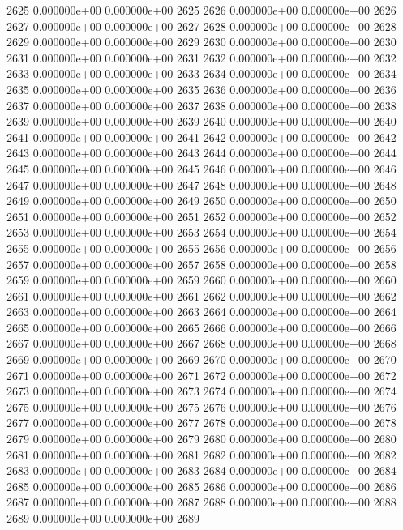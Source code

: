 \documentclass{article}
\begin{document}
\begin{Schunk}
\begin{Soutput}
2625   0.000000e+00   0.000000e+00 2625
2626   0.000000e+00   0.000000e+00 2626
2627   0.000000e+00   0.000000e+00 2627
2628   0.000000e+00   0.000000e+00 2628
2629   0.000000e+00   0.000000e+00 2629
2630   0.000000e+00   0.000000e+00 2630
2631   0.000000e+00   0.000000e+00 2631
2632   0.000000e+00   0.000000e+00 2632
2633   0.000000e+00   0.000000e+00 2633
2634   0.000000e+00   0.000000e+00 2634
2635   0.000000e+00   0.000000e+00 2635
2636   0.000000e+00   0.000000e+00 2636
2637   0.000000e+00   0.000000e+00 2637
2638   0.000000e+00   0.000000e+00 2638
2639   0.000000e+00   0.000000e+00 2639
2640   0.000000e+00   0.000000e+00 2640
2641   0.000000e+00   0.000000e+00 2641
2642   0.000000e+00   0.000000e+00 2642
2643   0.000000e+00   0.000000e+00 2643
2644   0.000000e+00   0.000000e+00 2644
2645   0.000000e+00   0.000000e+00 2645
2646   0.000000e+00   0.000000e+00 2646
2647   0.000000e+00   0.000000e+00 2647
2648   0.000000e+00   0.000000e+00 2648
2649   0.000000e+00   0.000000e+00 2649
2650   0.000000e+00   0.000000e+00 2650
2651   0.000000e+00   0.000000e+00 2651
2652   0.000000e+00   0.000000e+00 2652
2653   0.000000e+00   0.000000e+00 2653
2654   0.000000e+00   0.000000e+00 2654
2655   0.000000e+00   0.000000e+00 2655
2656   0.000000e+00   0.000000e+00 2656
2657   0.000000e+00   0.000000e+00 2657
2658   0.000000e+00   0.000000e+00 2658
2659   0.000000e+00   0.000000e+00 2659
2660   0.000000e+00   0.000000e+00 2660
2661   0.000000e+00   0.000000e+00 2661
2662   0.000000e+00   0.000000e+00 2662
2663   0.000000e+00   0.000000e+00 2663
2664   0.000000e+00   0.000000e+00 2664
2665   0.000000e+00   0.000000e+00 2665
2666   0.000000e+00   0.000000e+00 2666
2667   0.000000e+00   0.000000e+00 2667
2668   0.000000e+00   0.000000e+00 2668
2669   0.000000e+00   0.000000e+00 2669
2670   0.000000e+00   0.000000e+00 2670
2671   0.000000e+00   0.000000e+00 2671
2672   0.000000e+00   0.000000e+00 2672
2673   0.000000e+00   0.000000e+00 2673
2674   0.000000e+00   0.000000e+00 2674
2675   0.000000e+00   0.000000e+00 2675
2676   0.000000e+00   0.000000e+00 2676
2677   0.000000e+00   0.000000e+00 2677
2678   0.000000e+00   0.000000e+00 2678
2679   0.000000e+00   0.000000e+00 2679
2680   0.000000e+00   0.000000e+00 2680
2681   0.000000e+00   0.000000e+00 2681
2682   0.000000e+00   0.000000e+00 2682
2683   0.000000e+00   0.000000e+00 2683
2684   0.000000e+00   0.000000e+00 2684
2685   0.000000e+00   0.000000e+00 2685
2686   0.000000e+00   0.000000e+00 2686
2687   0.000000e+00   0.000000e+00 2687
2688   0.000000e+00   0.000000e+00 2688
2689   0.000000e+00   0.000000e+00 2689

\end{Soutput}
\end{Schunk}
\end{document}
